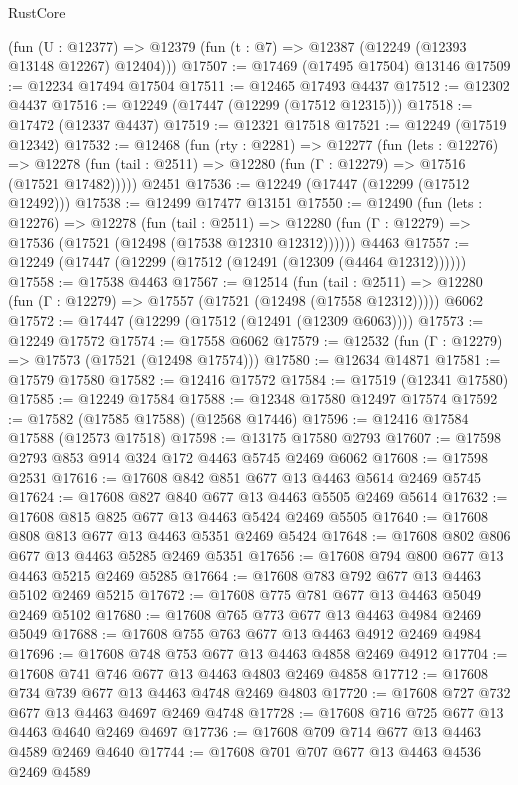 \begin{lexlean}{RustCore}
\begin{coremodule}
    (fun (U : @12377) => @12379 (fun (t : @7) => @12387 (@12249 (@12393 @13148 @12267) @12404)))
@17507 := @17469 (@17495 @17504) @13146
@17509 := @12234 @17494 @17504
@17511 := @12465 @17493 @4437
@17512 := @12302 @4437
@17516 := @12249 (@17447 (@12299 (@17512 @12315)))
@17518 := @17472 (@12337 @4437)
@17519 := @12321 @17518
@17521 := @12249 (@17519 @12342)
@17532 := @12468
    (fun (rty : @2281) =>
    @12277
      (fun (lets : @12276) =>
      @12278 (fun (tail : @2511) => @12280 (fun (Γ : @12279) => @17516 (@17521 @17482)))))
    @2451
@17536 := @12249 (@17447 (@12299 (@17512 @12492)))
@17538 := @12499 @17477 @13151
@17550 := @12490
    (fun (lets : @12276) =>
    @12278
      (fun (tail : @2511) =>
      @12280 (fun (Γ : @12279) => @17536 (@17521 (@12498 (@17538 @12310 @12312))))))
    @4463
@17557 := @12249 (@17447 (@12299 (@17512 (@12491 (@12309 (@4464 @12312))))))
@17558 := @17538 @4463
@17567 := @12514
    (fun (tail : @2511) => @12280 (fun (Γ : @12279) => @17557 (@17521 (@12498 (@17558 @12312)))))
    @6062
@17572 := @17447 (@12299 (@17512 (@12491 (@12309 @6063))))
@17573 := @12249 @17572
@17574 := @17558 @6062
@17579 := @12532 (fun (Γ : @12279) => @17573 (@17521 (@12498 @17574)))
@17580 := @12634 @14871
@17581 := @17579 @17580
@17582 := @12416 @17572
@17584 := @17519 (@12341 @17580)
@17585 := @12249 @17584
@17588 := @12348 @17580 @12497 @17574
@17592 := @17582 (@17585 @17588) (@12568 @17446)
@17596 := @12416 @17584 @17588 (@12573 @17518)
@17598 := @13175 @17580 @2793
@17607 := @17598 @2793 @853 @914 @324 @172 @4463 @5745 @2469 @6062
@17608 := @17598 @2531
@17616 := @17608 @842 @851 @677 @13 @4463 @5614 @2469 @5745
@17624 := @17608 @827 @840 @677 @13 @4463 @5505 @2469 @5614
@17632 := @17608 @815 @825 @677 @13 @4463 @5424 @2469 @5505
@17640 := @17608 @808 @813 @677 @13 @4463 @5351 @2469 @5424
@17648 := @17608 @802 @806 @677 @13 @4463 @5285 @2469 @5351
@17656 := @17608 @794 @800 @677 @13 @4463 @5215 @2469 @5285
@17664 := @17608 @783 @792 @677 @13 @4463 @5102 @2469 @5215
@17672 := @17608 @775 @781 @677 @13 @4463 @5049 @2469 @5102
@17680 := @17608 @765 @773 @677 @13 @4463 @4984 @2469 @5049
@17688 := @17608 @755 @763 @677 @13 @4463 @4912 @2469 @4984
@17696 := @17608 @748 @753 @677 @13 @4463 @4858 @2469 @4912
@17704 := @17608 @741 @746 @677 @13 @4463 @4803 @2469 @4858
@17712 := @17608 @734 @739 @677 @13 @4463 @4748 @2469 @4803
@17720 := @17608 @727 @732 @677 @13 @4463 @4697 @2469 @4748
@17728 := @17608 @716 @725 @677 @13 @4463 @4640 @2469 @4697
@17736 := @17608 @709 @714 @677 @13 @4463 @4589 @2469 @4640
@17744 := @17608 @701 @707 @677 @13 @4463 @4536 @2469 @4589

\end{coremodule}
\end{lexlean}
